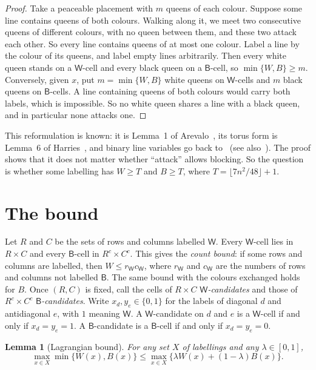 \documentclass[11pt]{article}
\newtheorem{lemma}[theorem]{Lemma}
\theoremstyle{remark}
\newcommand{\W}{\mathsf W}
\newcommand{\B}{\mathsf B}
\begin{document}
\begin{proof}
Take a peaceable placement with $m$ queens of each colour. Suppose some line contains queens of both
colours. Walking along it, we meet two consecutive queens of different colours, with no queen between
them, and these two attack each other. So every line contains queens of at most one colour. Label a line
by the colour of its queens, and label empty lines arbitrarily. Then every white queen stands on a
$\W$-cell and every black queen on a $\B$-cell, so $\min\{W,B\}\ge m$. Conversely, given $x$, put
$m=\min\{W,B\}$ white queens on $\W$-cells and $m$ black queens on $\B$-cells. A line containing queens of
both colours would carry both labels, which is impossible. So no white queen shares a line with a black
queen, and in particular none attacks one.
\end{proof}

This reformulation is known: it is Lemma~1 of Arevalo~\cite{Arevalo}, its torus form is Lemma~6 of
Harries~\cite{Harries}, and binary line variables go back to~\cite{SPG,PB} (see also~\cite{DF}). The proof shows that it does
not matter whether ``attack'' allows blocking. So the question is whether
some labelling has $W\ge T$ and $B\ge T$, where $T=\lfloor7n^2/48\rfloor+1$.

\section{The bound}

Let $R$ and $C$ be the sets of rows and columns labelled $\W$. Every $\W$-cell lies in $R\times C$ and
every $\B$-cell in $R^c\times C^c$. This gives the \emph{count bound}: if some rows and columns are
labelled, then $W\le r_{\W} c_{\W}$, where $r_{\W}$ and $c_{\W}$ are the numbers of rows and columns not
labelled $\B$. The same bound with the colours exchanged holds for $B$. Once $(R,C)$ is fixed, call the
cells of $R\times C$ \emph{$\W$-candidates} and those of $R^c\times C^c$ \emph{$\B$-candidates}. Write
$x_d,y_e\in\{0,1\}$ for the labels of diagonal $d$ and antidiagonal $e$, with $1$ meaning $\W$. A
$\W$-candidate on $d$ and $e$ is a $\W$-cell if and only if $x_d=y_e=1$. A $\B$-candidate is a $\B$-cell
if and only if $x_d=y_e=0$.

\begin{lemma}[Lagrangian bound]\label{lem:lag}
For any set $X$ of labellings and any $\lambda\in[0,1]$,
\[\max_{x\in X}\min\{W(x),B(x)\}\le \max_{x\in X}\{\lambda W(x)+(1-\lambda)B(x)\}.\]
\end{lemma}
\end{document}
